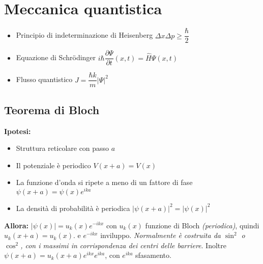 \documentclass{article}
\begin{document}
\newpage

\section{Meccanica quantistica}
\begin{itemize}
  \item Principio di indeterminazione di Heisenberg \( \Delta x \Delta p \geq \dfrac{\hbar}{2} \)
  \item Equazione di Schrödinger \( i \hbar \dfrac{\partial \Psi}{\partial t} (x, t) = \hat{H} \Psi (x,t) \)
  \item Flusso quantistico \( J = \dfrac{\hbar k}{m} \left| \Psi \right| ^ 2 \)
\end{itemize}

\subsection{Teorema di Bloch}
\textbf{Ipotesi:}
\begin{itemize}
  \item Struttura reticolare con passo \( a \)
  \item Il potenziale è periodico \( V(x+a) = V(x) \)
  \item La funzione d'onda si ripete a meno di un fattore di fase \( \psi(x+a) = \psi(x) e^{ i k  a} \)
  \item La densità di probabilità è periodica \( \left| \psi(x+a) \right|^2 = \left| \psi(x)  \right|^2 \)
\end{itemize}
\textbf{Allora:} \( \left| \psi(x) \right| = u_k(x) e^{ -ikx } \) con \( u_k(x) \) funzione di Bloch \textit{(periodica)}, quindi \( u_k (x+a) = u_k(x).\) e \( e^{ -ikx } \) inviluppo. \newline \textit{Normalmente è costruita da \(\sin^2\) o \(\cos^2\), con i massimi in corrispondenza dei centri delle barriere}. \newline
Inoltre \( \psi(x+a) = u_k (x+a) e^{ikx} e^{ika} \), con \( e^{ika} \) sfasamento.
\end{document}
